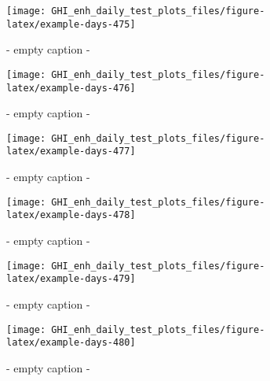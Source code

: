 \documentclass[
  10pt,
  a4paper,oneside]{article}
\begin{document}
\begin{figure}[H]

{\centering \texttt{[image: GHI\_enh\_daily\_test\_plots\_files/figure-latex/example-days-475]} 

}

\caption{ - empty caption - }\label{fig:example-days-475}
\end{figure}

\begin{figure}[H]

{\centering \texttt{[image: GHI\_enh\_daily\_test\_plots\_files/figure-latex/example-days-476]} 

}

\caption{ - empty caption - }\label{fig:example-days-476}
\end{figure}

\begin{figure}[H]

{\centering \texttt{[image: GHI\_enh\_daily\_test\_plots\_files/figure-latex/example-days-477]} 

}

\caption{ - empty caption - }\label{fig:example-days-477}
\end{figure}

\begin{figure}[H]

{\centering \texttt{[image: GHI\_enh\_daily\_test\_plots\_files/figure-latex/example-days-478]} 

}

\caption{ - empty caption - }\label{fig:example-days-478}
\end{figure}

\begin{figure}[H]

{\centering \texttt{[image: GHI\_enh\_daily\_test\_plots\_files/figure-latex/example-days-479]} 

}

\caption{ - empty caption - }\label{fig:example-days-479}
\end{figure}

\begin{figure}[H]

{\centering \texttt{[image: GHI\_enh\_daily\_test\_plots\_files/figure-latex/example-days-480]} 

}

\caption{ - empty caption - }\label{fig:example-days-480}
\end{figure}
\end{document}
